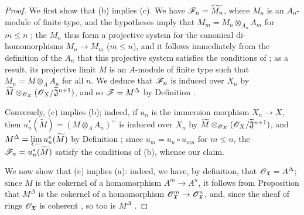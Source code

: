 \begin{proof}
\label{proof-1.10.10.5}
We first show that (b) implies (c).
We have $\mathscr{F}_n=\widetilde{M_n}$, where $M_n$ is an $A_n$-module of finite type, and the hypotheses imply that $M_m=M_n\otimes_{A_n}A_m$ for $m\leq n$ ; the $M_n$ thus form a projective system for the canonical di-homomorphisms $M_n\to M_m$ ($m\leq n$), and it follows immediately from the definition of the $A_n$ that this projective system satisfies the conditions of ; as a result, its projective limit $M$ is an $A$-module of finite type such that $M_n=M\otimes_A A_n$ for all $n$.
We deduce that $\mathscr{F}_n$ is induced over $X_n$ by $\widetilde{M}\otimes_{\mathscr{O}_X}(\mathscr{O}_X/\widetilde{\mathfrak{J}}^{n+1})$, and so $\mathscr{F}=M^\Delta$ by Definition .

Conversely, (c) implies (b); indeed, if $u_n$ is the immersion morphism $X_n\to X$, then $u_n^*(\widetilde{M})=(M\otimes_A A_n)^\sim$ is induced over $X_n$ by $\widetilde{M}\otimes_{\mathscr{O}_X}(\mathscr{O}_X/\widetilde{\mathfrak{J}}^{n+1})$, and $M^\Delta=\varprojlim u_n^*(\widetilde{M})$ by Definition ; since $u_m=u_n\circ u_{mn}$ for $m\leq n$, the $\mathscr{F}_n=u_n^*(\widetilde{M})$ satisfy the conditions of (b), whence our claim.

We now show that (c) implies (a): indeed, we have, by definition, that $\mathscr{O}_\mathfrak{X}=A^\Delta$; since $M$ is the cokernel of a homomorphism $A^m\to A^n$, it follows from Proposition  that $M^\Delta$ is the cokernel of a homomorphism $\sh{O}_\mathfrak{X}^m\to\sh{O}_\mathfrak{X}^n$, and, since the sheaf of rings $\mathscr{O}_\mathfrak{X}$ is coherent , so too is $M^\Delta$ .


\end{proof}
